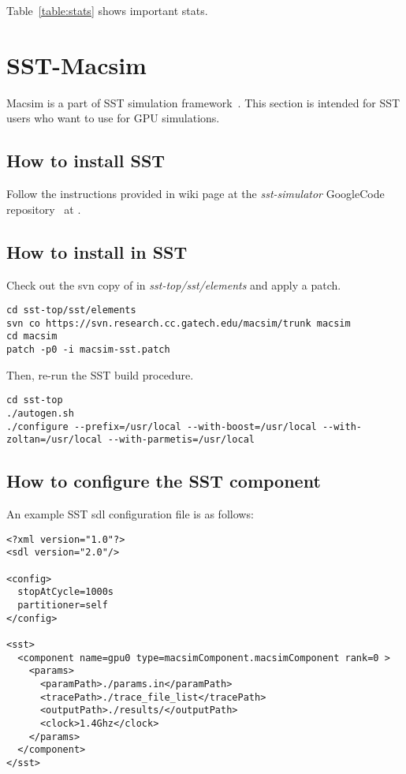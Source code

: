 Table~\ref{table:stats} shows important stats.



\section{SST-Macsim}

Macsim is a part of SST simulation framework~\cite{sst}. This section
is intended for SST users who want to use \SIM for GPU simulations.

\subsection{How to install SST}

Follow the instructions provided in wiki page at the
\textit{sst-simulator} GoogleCode repository~\cite{sst-google} at
.

\subsection{How to install \SIM in SST}

Check out the svn copy of \SIM in \textit{sst-top/sst/elements} and
apply a patch. 

\begin{Verbatim}
cd sst-top/sst/elements
svn co https://svn.research.cc.gatech.edu/macsim/trunk macsim
cd macsim
patch -p0 -i macsim-sst.patch
\end{Verbatim}

Then, re-run the SST build procedure.

\begin{Verbatim}
cd sst-top
./autogen.sh
./configure --prefix=/usr/local --with-boost=/usr/local --with-zoltan=/usr/local --with-parmetis=/usr/local
\end{Verbatim}

\subsection{How to configure the \SIM SST component}

An example SST sdl configuration file is as follows:

\begin{Verbatim}
<?xml version="1.0"?>
<sdl version="2.0"/>

<config>
  stopAtCycle=1000s
  partitioner=self
</config>

<sst>
  <component name=gpu0 type=macsimComponent.macsimComponent rank=0 >
    <params>
      <paramPath>./params.in</paramPath>
      <tracePath>./trace_file_list</tracePath>
      <outputPath>./results/</outputPath>
      <clock>1.4Ghz</clock>
    </params>
  </component>
</sst>
\end{Verbatim}

